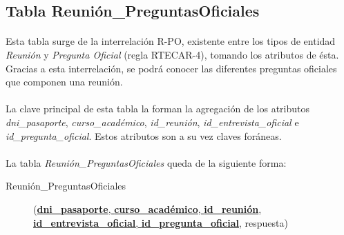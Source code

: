   \subsection{Tabla Reunión\_PreguntasOficiales}

      \paragraph{}Esta tabla surge de la interrelación R-PO, existente entre
      los tipos de entidad \textit{Reunión} y \textit{Pregunta Oficial}
      (regla RTECAR-4), tomando los atributos de ésta. Gracias a esta
      interrelación, se podrá conocer las diferentes preguntas oficiales que
      componen una reunión.

      \paragraph{}La clave principal de esta tabla la forman la agregación de
      los atributos \textit{dni\_pasaporte}, \textit{curso\_académico},
      \textit{id\_reunión}, \textit{id\_entrevista\_oficial} e
      \textit{id\_pregunta\_oficial}. Estos atributos son a su vez claves
      foráneas.

      \paragraph{}La tabla \textit{Reunión\_PreguntasOficiales} queda de la
      siguiente forma:

      \begin{description}
         \item[Reunión\_PreguntasOficiales] \begin{flushleft}(\underline{\textbf{dni\_pasaporte}, \textbf{curso\_académico},
         \textbf{id\_reunión}}, \underline{\textbf{id\_entrevista\_oficial},
         \textbf{id\_pregunta\_oficial}}, respuesta)\end{flushleft}
      \end{description}